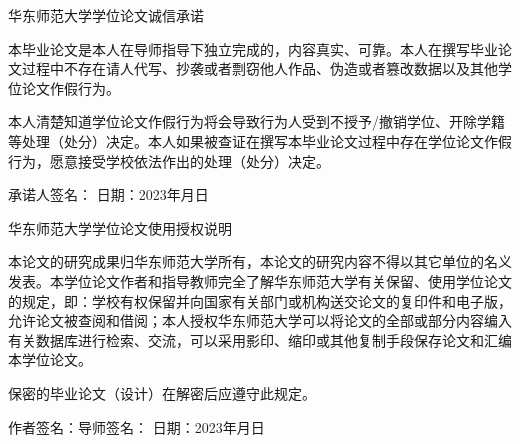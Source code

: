 \clearpage                                          %
\thispagestyle{empty}                               %

\vspace{10mm}
\begin{center}
{\Large\textbf\heiti{} 华东师范大学学位论文诚信承诺}   %
\end{center}



本毕业论文是本人在导师指导下独立完成的，内容真实、可靠。本人在撰写毕业论文过程中不存在请人代写、抄袭或者剽窃他人作品、伪造或者篡改数据以及其他学位论文作假行为。

本人清楚知道学位论文作假行为将会导致行为人受到不授予/撤销学位、开除学籍等处理（处分）决定。本人如果被查证在撰写本毕业论文过程中存在学位论文作假行为，愿意接受学校依法作出的处理（处分）决定。

\vspace{5mm}
承诺人签名： \hfill { 日期：2023年\quad 月\quad 日}


\vspace{30mm}
\begin{center}
{\Large\textbf\heiti{} 华东师范大学学位论文使用授权说明}   %
\end{center}

本论文的研究成果归华东师范大学所有，本论文的研究内容不得以其它单位的名义发表。本学位论文作者和指导教师完全了解华东师范大学有关保留、使用学位论文的规定，即：学校有权保留并向国家有关部门或机构送交论文的复印件和电子版，允许论文被查阅和借阅；本人授权华东师范大学可以将论文的全部或部分内容编入有关数据库进行检索、交流，可以采用影印、缩印或其他复制手段保存论文和汇编本学位论文。

保密的毕业论文（设计）在解密后应遵守此规定。

\vspace{5mm}
作者签名：\qquad\qquad\qquad\qquad\quad             导师签名：          \hfill { 日期：2023年\quad 月\quad 日}


\newpage
